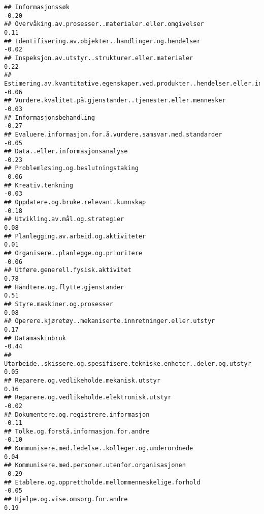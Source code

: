 \documentclass[
]{article}
\begin{document}
\begin{verbatim}
## Informasjonssøk                                                                  -0.20
## Overvåking.av.prosesser..materialer.eller.omgivelser                              0.11
## Identifisering.av.objekter..handlinger.og.hendelser                              -0.02
## Inspeksjon.av.utstyr..strukturer.eller.materialer                                 0.22
## Estimering.av.kvantitative.egenskaper.ved.produkter..hendelser.eller.informasjon -0.06
## Vurdere.kvalitet.på.gjenstander..tjenester.eller.mennesker                       -0.03
## Informasjonsbehandling                                                           -0.27
## Evaluere.informasjon.for.å.vurdere.samsvar.med.standarder                        -0.05
## Data..eller.informasjonsanalyse                                                  -0.23
## Problemløsing.og.beslutningstaking                                               -0.06
## Kreativ.tenkning                                                                 -0.03
## Oppdatere.og.bruke.relevant.kunnskap                                             -0.18
## Utvikling.av.mål.og.strategier                                                    0.08
## Planlegging.av.arbeid.og.aktiviteter                                              0.01
## Organisere..planlegge.og.prioritere                                              -0.06
## Utføre.generell.fysisk.aktivitet                                                  0.78
## Håndtere.og.flytte.gjenstander                                                    0.51
## Styre.maskiner.og.prosesser                                                       0.08
## Operere.kjøretøy..mekaniserte.innretninger.eller.utstyr                           0.17
## Datamaskinbruk                                                                   -0.44
## Utarbeide..skissere.og.spesifisere.tekniske.enheter..deler.og.utstyr              0.05
## Reparere.og.vedlikeholde.mekanisk.utstyr                                          0.16
## Reparere.og.vedlikeholde.elektronisk.utstyr                                      -0.02
## Dokumentere.og.registrere.informasjon                                            -0.11
## Tolke.og.forstå.informasjon.for.andre                                            -0.10
## Kommunisere.med.ledelse..kolleger.og.underordnede                                 0.04
## Kommunisere.med.personer.utenfor.organisasjonen                                  -0.29
## Etablere.og.opprettholde.mellommenneskelige.forhold                              -0.05
## Hjelpe.og.vise.omsorg.for.andre                                                   0.19

\end{verbatim}
\end{document}
